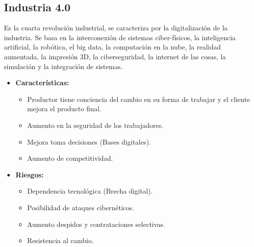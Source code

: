 \documentclass{templateNote}
\begin{document}
\subsection{Industria 4.0}
\noindent Es la cuarta revolución industrial, se caracteriza por la digitalización de la industria. Se basa en la interconexión de sistemas ciber-físicos, la inteligencia artificial, la robótica, el big data, la computación en la nube, la realidad aumentada, la impresión 3D, la ciberseguridad, la internet de las cosas, la simulación y la integración de sistemas.
\begin{itemize}
    \item \textbf{Características:}
    \begin{itemize}
        \item Productor tiene conciencia del cambio en su forma de trabajar y el cliente mejora el producto final.
        \item Aumento en la seguridad de los trabajadores.
        \item Mejora toma decisiones (Bases digitales).
        \item Aumento de competitividad.
    \end{itemize}
    \item \textbf{Riesgos:}
    \begin{itemize}
        \item Dependencia tecnológica (Brecha digital).
        \item Posibilidad de ataques cibernéticos.
        \item Aumento despidos y contrataciones selectivas.
        \item Resistencia al cambio.
    \end{itemize}
\end{itemize}
\end{document}
